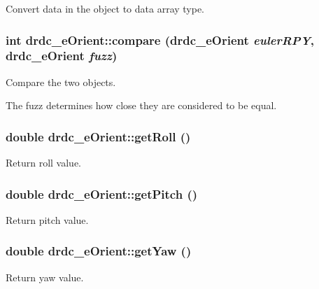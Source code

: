 Convert data in the object to data array type. 

\hypertarget{classdrdc__eOrient_566075263f078ae4f17560cb7a74fb6a}{
\subsubsection[compare]{\setlength{\rightskip}{0pt plus 5cm}int drdc\_\-eOrient::compare ({\bf drdc\_\-eOrient} {\em eulerRPY}, \/  {\bf drdc\_\-eOrient} {\em fuzz})}}
\label{classdrdc__eOrient_566075263f078ae4f17560cb7a74fb6a}


Compare the two objects. 

The fuzz determines how close they are considered to be equal. \hypertarget{classdrdc__eOrient_2b54493f2d83f6fa9cd4acdfd2713943}{
\subsubsection[getRoll]{\setlength{\rightskip}{0pt plus 5cm}double drdc\_\-eOrient::getRoll ()}}
\label{classdrdc__eOrient_2b54493f2d83f6fa9cd4acdfd2713943}


Return roll value. 

\hypertarget{classdrdc__eOrient_20d6a9876fd56273f7b0a7af25e479a9}{
\subsubsection[getPitch]{\setlength{\rightskip}{0pt plus 5cm}double drdc\_\-eOrient::getPitch ()}}
\label{classdrdc__eOrient_20d6a9876fd56273f7b0a7af25e479a9}


Return pitch value. 

\hypertarget{classdrdc__eOrient_53631fe116e11fe4e67b673cc43fd467}{
\subsubsection[getYaw]{\setlength{\rightskip}{0pt plus 5cm}double drdc\_\-eOrient::getYaw ()}}
\label{classdrdc__eOrient_53631fe116e11fe4e67b673cc43fd467}


Return yaw value. 


